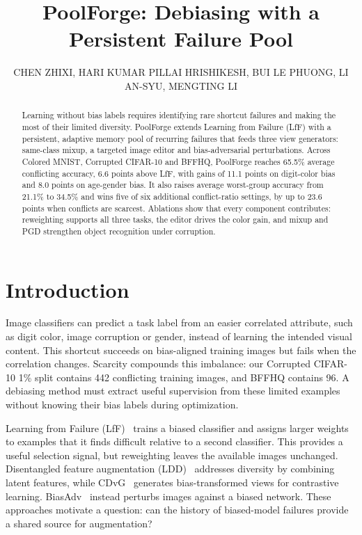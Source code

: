 \documentclass[10pt,twocolumn,letterpaper]{article}
\title{PoolForge: Debiasing with a Persistent Failure Pool}
\author{{\small CHEN ZHIXI, HARI KUMAR PILLAI HRISHIKESH, BUI LE PHUONG, LI AN-SYU, MENGTING LI}}
\begin{document}
\maketitle

\begin{abstract}
Learning without bias labels requires identifying rare shortcut failures and making the most of their limited diversity. PoolForge extends Learning from Failure (LfF) with a persistent, adaptive memory pool of recurring failures that feeds three view generators: same-class mixup, a targeted image editor and bias-adversarial perturbations. Across Colored MNIST, Corrupted CIFAR-10 and BFFHQ, PoolForge reaches 65.5\% average conflicting accuracy, 6.6 points above LfF, with gains of 11.1 points on digit-color bias and 8.0 points on age-gender bias. It also raises average worst-group accuracy from 21.1\% to 34.5\% and wins five of six additional conflict-ratio settings, by up to 23.6 points when conflicts are scarcest. Ablations show that every component contributes: reweighting supports all three tasks, the editor drives the color gain, and mixup and PGD strengthen object recognition under corruption.
\end{abstract}

\section{Introduction}
Image classifiers can predict a task label from an easier correlated attribute, such as digit color, image corruption or gender, instead of learning the intended visual content. This shortcut succeeds on bias-aligned training images but fails when the correlation changes. Scarcity compounds this imbalance: our Corrupted CIFAR-10 1\% split contains 442 conflicting training images, and BFFHQ contains 96. A debiasing method must extract useful supervision from these limited examples without knowing their bias labels during optimization.

Learning from Failure (LfF)~\cite{nam2020lff} trains a biased classifier and assigns larger weights to examples that it finds difficult relative to a second classifier. This provides a useful selection signal, but reweighting leaves the available images unchanged. Disentangled feature augmentation (LDD)~\cite{lee2021ldd} addresses diversity by combining latent features, while CDvG~\cite{jung2023cdvg} generates bias-transformed views for contrastive learning. BiasAdv~\cite{lim2023biasadv} instead perturbs images against a biased network. These approaches motivate a question: can the history of biased-model failures provide a shared source for augmentation?
\end{document}
